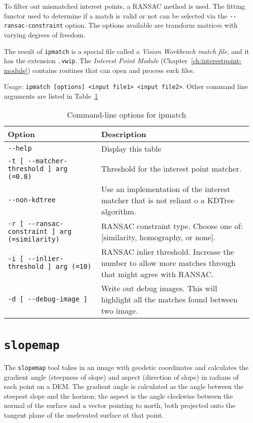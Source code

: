 To filter out mismatched interest points, a RANSAC method is used. The fitting functor used to determine if a match is valid or not can be selected via the \verb#--ransac-constraint# option. The options available are transform matrices with varying degrees of freedom.

The result of \verb#ipmatch# is a special file called a \emph{Vision Workbench match file}, and it has the extension \verb#.vwip#. The \emph{Interest Point Module} (Chapter~\ref{ch:interestpoint-module}) contains routines that can open and process such files.

Usage: \verb#ipmatch [options] <input file1> <input file2>#. Other command line arguments are listed in Table~\ref{tbl:ipmatch}

\begin{longtable}{|l|p{9cm}|}
\caption{Command-line options for ipmatch}
\label{tbl:ipmatch}
\endfirsthead
\endhead
\endfoot
\endlastfoot
\hline
Option & Description \\ \hline \hline
\verb#--help# & Display this table\\ \hline
\verb#-t [ --matcher-threshold ] arg (=0.8)# & Threshold for the interest point matcher.\\ \hline
\verb#--non-kdtree# & Use an implementation of the interest matcher that is not reliant o a KDTree algorithm.\\ \hline
\verb#-r [ --ransac-constraint ] arg (=similarity)# & RANSAC constraint type. Choose one of: [similarity, homography, or none].\\ \hline
\verb#-i [ --inlier-threshold ] arg (=10)# & RANSAC inlier threshold. Increase the number to allow more matches through that might agree with RANSAC.\\ \hline
\verb#-d [ --debug-image ]# & Write out debug images. This will highlight all the matches found between two image.\\ \hline
\end{longtable}


\section{{\tt slopemap}}\label{sec:slopemap} %
The \verb#slopemap# tool takes in an image with geodetic coordinates and calculates the gradient angle (steepness of slope) and aspect (direction of slope) in radians of each point on a DEM. The gradient angle is calculated as the angle between the steepest slope and the horizon; the aspect is the angle clockwise between the normal of the surface and a vector pointing to north, both projected onto the tangent plane of the unelevated surface at that point. 

